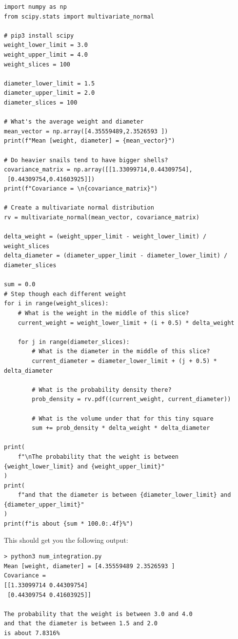 \begin{verbatim}
import numpy as np
from scipy.stats import multivariate_normal

# pip3 install scipy
weight_lower_limit = 3.0
weight_upper_limit = 4.0
weight_slices = 100

diameter_lower_limit = 1.5
diameter_upper_limit = 2.0
diameter_slices = 100

# What's the average weight and diameter
mean_vector = np.array([4.35559489,2.3526593 ])
print(f"Mean [weight, diameter] = {mean_vector}")

# Do heavier snails tend to have bigger shells?
covariance_matrix = np.array([[1.33099714,0.44309754],
 [0.44309754,0.41603925]])
print(f"Covariance = \n{covariance_matrix}")

# Create a multivariate normal distribution
rv = multivariate_normal(mean_vector, covariance_matrix)

delta_weight = (weight_upper_limit - weight_lower_limit) / weight_slices
delta_diameter = (diameter_upper_limit - diameter_lower_limit) / diameter_slices

sum = 0.0
# Step though each different weight
for i in range(weight_slices):
    # What is the weight in the middle of this slice?
    current_weight = weight_lower_limit + (i + 0.5) * delta_weight

    for j in range(diameter_slices):
        # What is the diameter in the middle of this slice?
        current_diameter = diameter_lower_limit + (j + 0.5) * delta_diameter

        # What is the probability density there?
        prob_density = rv.pdf((current_weight, current_diameter))

        # What is the volume under that for this tiny square
        sum += prob_density * delta_weight * delta_diameter

print(
    f"\nThe probability that the weight is between {weight_lower_limit} and {weight_upper_limit}"
)
print(
    f"and that the diameter is between {diameter_lower_limit} and {diameter_upper_limit}"
)
print(f"is about {sum * 100.0:.4f}%")
\end{verbatim}

This should get you the following output:

\begin{verbatim}
> python3 num_integration.py
Mean [weight, diameter] = [4.35559489 2.3526593 ]
Covariance =
[[1.33099714 0.44309754]
 [0.44309754 0.41603925]]

The probability that the weight is between 3.0 and 4.0
and that the diameter is between 1.5 and 2.0
is about 7.8316%
\end{verbatim}
